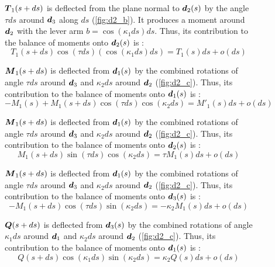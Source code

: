 \begin{figure}[p]
\begin{fullpage}
		$\boldsymbol{T}_1(s+ds)$ is deflected from the plane normal to $\boldsymbol{d}_2(s)$ by the angle $\tau ds$ around $\boldsymbol{d}_3$ along $ds$ (\cref{fig:d2_b}). It produces a moment around $\boldsymbol{d}_2$ with the lever arm $b =  \cos(\kappa_1 ds) ds$. Thus, its contribution to the balance of moments onto $\boldsymbol{d}_2(s)$ is : 
	\begin{equation*}
		T_1(s+ds) \cos(\tau ds) (\cos(\kappa_1 ds) ds) = T_1(s) ds + o(ds)
	\end{equation*}
	
	$\boldsymbol{M}_1(s+ds)$ is deflected from $\boldsymbol{d}_1(s)$ by the combined rotations of angle $\tau ds$ around $\boldsymbol{d}_3$ and $\kappa_2 ds$ around $\boldsymbol{d}_2$ (\cref{fig:d2_c}). Thus, its contribution to the balance of moments onto $\boldsymbol{d}_1(s)$ is : 
	\begin{equation*}
		-M_1(s) + M_1(s+ds) \cos(\tau ds) \cos(\kappa_2 ds) = M'_1 (s) ds + o(ds)
	\end{equation*}	
	
	$\boldsymbol{M}_1(s+ds)$ is deflected from $\boldsymbol{d}_1(s)$ by the combined rotations of angle $\tau ds$ around $\boldsymbol{d}_3$ and $\kappa_2 ds$ around $\boldsymbol{d}_2$ (\cref{fig:d2_c}). Thus, its contribution to the balance of moments onto $\boldsymbol{d}_2(s)$ is : 
	\begin{equation*}
		M_1(s+ds) \sin(\tau ds) \cos(\kappa_2 ds) = \tau M_1 (s) ds + o(ds)
	\end{equation*}	
	
	$\boldsymbol{M}_1(s+ds)$ is deflected from $\boldsymbol{d}_1(s)$ by the combined rotations of angle $\tau ds$ around $\boldsymbol{d}_3$ and $\kappa_2 ds$ around $\boldsymbol{d}_2$ (\cref{fig:d2_c}). Thus, its contribution to the balance of moments onto $\boldsymbol{d}_3(s)$ is : 
	\begin{equation*}
		-M_1(s+ds) \cos(\tau ds) \sin(\kappa_2 ds) = -\kappa_2 M_1 (s) ds + o(ds)
	\end{equation*}	
	
	$\boldsymbol{Q}(s+ds)$ is deflected from $\boldsymbol{d}_3(s)$ by the combined rotations of angle $\kappa_1 ds$ around $\boldsymbol{d}_1$ and $\kappa_2 ds$ around $\boldsymbol{d}_2$ (\cref{fig:d2_c}). Thus, its contribution to the balance of moments onto $\boldsymbol{d}_1(s)$ is : 
	\begin{equation*}
		Q(s+ds) \cos(\kappa_1 ds) \sin(\kappa_2 ds) = \kappa_2 Q(s) ds + o(ds)
	\end{equation*}	
	  \end{fullpage}
\end{figure}

\clearpage
